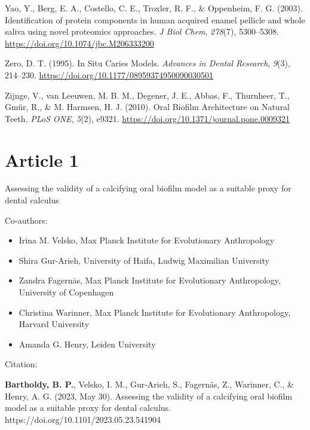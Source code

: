 \documentclass[
  letterpaper,
]{book}
\providecommand{\tightlist}{%
  \setlength{\itemsep}{0pt}\setlength{\parskip}{0pt}}
\newlength{\cslhangindent}
\newlength{\cslentryspacingunit} %
\newenvironment{CSLReferences}[2] %
 {%
  \setlength{\parindent}{0pt}
  \ifodd #1
  \let\oldpar\par
  \def\par{\hangindent=\cslhangindent\oldpar}
  \fi
  \setlength{\parskip}{#2\cslentryspacingunit}
 }%
 {}
\begin{document}
\begin{CSLReferences}{1}{0}
\leavevmode{}%
Yao, Y., Berg, E. A., Costello, C. E., Troxler, R. F., \& Oppenheim, F.
G. (2003). Identification of protein components in human acquired enamel
pellicle and whole saliva using novel proteomics approaches. \emph{J
Biol Chem}, \emph{278}(7), 5300--5308.
\url{https://doi.org/10.1074/jbc.M206333200}

\leavevmode{}%
Zero, D. T. (1995). In {Situ Caries Models}. \emph{Advances in Dental
Research}, \emph{9}(3), 214--230.
\url{https://doi.org/10.1177/08959374950090030501}

\leavevmode{}%
Zijnge, V., van Leeuwen, M. B. M., Degener, J. E., Abbas, F., Thurnheer,
T., Gmür, R., \& M. Harmsen, H. J. (2010). Oral {Biofilm Architecture}
on {Natural Teeth}. \emph{PLoS ONE}, \emph{5}(2), e9321.
\url{https://doi.org/10.1371/journal.pone.0009321}

\end{CSLReferences}


\hypertarget{byoc-valid}{%
\chapter{Article 1}\label{byoc-valid}}

Assessing the validity of a calcifying oral biofilm model as a suitable
proxy for dental calculus

\hfill\break

Co-authors:

\begin{itemize}
\tightlist
\item
  Irina M. Velsko, Max Planck Institute for Evolutionary Anthropology
\item
  Shira Gur-Arieh, University of Haifa, Ludwig Maximilian University
\item
  Zandra Fagernäs, Max Planck Institute for Evolutionary Anthropology,
  University of Copenhagen
\item
  Christina Warinner, Max Planck Institute for Evolutionary
  Anthropology, Harvard University
\item
  Amanda G. Henry, Leiden University
\end{itemize}

\vfill

Citation:

\textbf{Bartholdy, B. P.}, Velsko, I. M., Gur-Arieh, S., Fagernäs, Z.,
Warinner, C., \& Henry, A. G. (2023, May 30). Assessing the validity of
a calcifying oral biofilm model as a suitable proxy for dental calculus.
https://doi.org/10.1101/2023.05.23.541904
\end{document}
